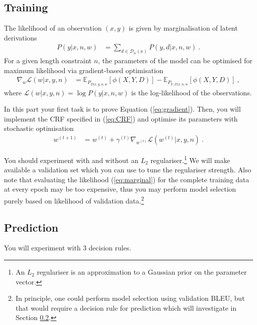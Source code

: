 \subsection{Training}

The likelihood of an observation $( x,  y)$ is given by marginalisation of latent derivations
\begin{align}\label{eq:marginal}
	P( y| x, n, w) &= \sum_{ d \in \mathcal D_n( x)} P( y,  d| x, n, w) ~ .
\end{align}
For a given length constraint $n$, the parameters of the model can be optimised for maximum likelihood via gradient-based optimisation
\begin{align}\label{eq:gradient}
\nabla_w \mathcal L(w| x,  y, n) &= \mathbb E_{P_{D|x,y,n,w}}[\phi(X, Y, D)] - \mathbb E_{P_{Y,D|x,n,w}}[\phi(X, Y, D)] ~,
\end{align}
where $\mathcal L(w| x,  y, n) = \log P( y| x, n, w)$ is the log-likelihood of the observations.

In this part your first task is to prove Equation (\ref{eq:gradient}).
Then, you will implement the CRF specified in (\ref{eq:CRF}) and optimise its parameters with stochastic optimisation
\begin{align}
	w^{(t+1)} &= w^{(t)} + \gamma^{(t)} \nabla_{w^{(t)}} \mathcal L(w^{(t)}|x, y, n) ~ .
\end{align}

You should experiment with and without an $L_2$ regulariser.\footnote{An $L_2$ regulariser is an approximation to a Gaussian prior on the parameter vector.}
We will make available a validation set which you can use to tune the regulariser strength.
Also note that evaluating the likelihood (\ref{eq:marginal}) for the complete training data at every epoch may be too expensive, thus you may perform model selection purely based on likelihood of validation data.\footnote{In principle, one could perform model selection using validation BLEU, but that would require a decision rule for prediction which will investigate in Section \ref{sec:prediction}.}

\subsection{Prediction}\label{sec:prediction}

You will experiment with $3$ decision rules.

